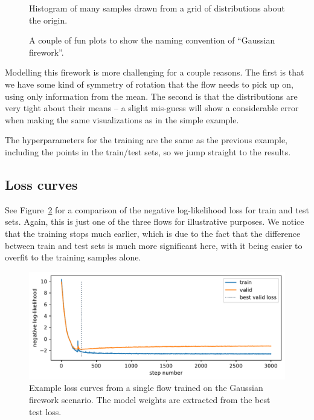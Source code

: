 \documentclass[
  11pt,
  numbers=noendperiod]{book}
\begin{document}
\begin{figure}
\begin{minipage}[t]{0.5\linewidth}
{{}

\caption*{Histogram of many samples drawn from a grid of distributions
about the origin.}

}

\end{minipage}%

\caption{\label{fig-firework}A couple of fun plots to show the naming
convention of ``Gaussian firework''.}

\end{figure}

Modelling this firework is more challenging for a couple reasons. The
first is that we have some kind of symmetry of rotation that the flow
needs to pick up on, using only information from the mean. The second is
that the distributions are very tight about their means -- a slight
mis-guess will show a considerable error when making the same
visualizations as in the simple example.

The hyperparameters for the training are the same as the previous
example, including the points in the train/test sets, so we jump
straight to the results.

\hypertarget{loss-curves-1}{%
\subsection{Loss curves}\label{loss-curves-1}}

See Figure~\ref{fig-complex-loss} for a comparison of the negative
log-likelihood loss for train and test sets. Again, this is just one of
the three flows for illustrative purposes. We notice that the training
stops much earlier, which is due to the fact that the difference between
train and test sets is much more significant here, with it being easier
to overfit to the training samples alone.

\begin{figure}

{\centering \includegraphics{./images/flows/complex/non-simple_example_loss.pdf}

}

\caption{\label{fig-complex-loss}Example loss curves from a single flow
trained on the Gaussian firework scenario. The model weights are
extracted from the best test loss.}

\end{figure}
\end{document}

